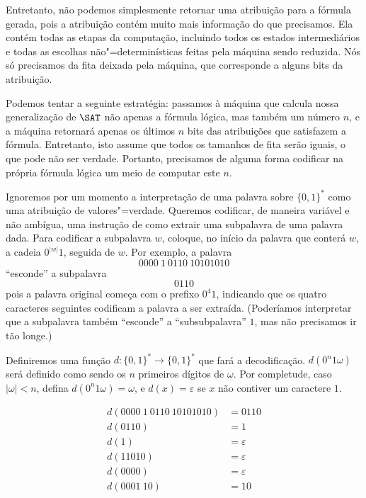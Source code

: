 Entretanto,
não podemos simplesmente retornar uma atribuição para a fórmula gerada,
pois a atribuição contém muito mais informação do que precisamos.
Ela contém todas as etapas da computação,
incluindo todos os estados intermediários
e todas as escolhas não"=determinísticas feitas pela máquina sendo reduzida.
Nós só precisamos da fita deixada pela máquina,
que corresponde a alguns bits da atribuição.

Podemos tentar a seguinte estratégia:
passamos à máquina que calcula nossa generalização de $\SAT$
não apenas a fórmula lógica,
mas também um número $n$,
e a máquina retornará apenas os últimos $n$
bits das atribuições que satisfazem a fórmula.
Entretanto, isto assume que todos os tamanhos de fita serão iguais,
o que pode não ser verdade.
Portanto, precisamos de alguma forma codificar na própria fórmula lógica
um meio de computar este $n$.

Ignoremos por um momento a interpretação de uma palavra sobre $\{0, 1\}^*$
como uma atribuição de valores"=verdade.
Queremos codificar, de maneira variável e não ambígua,
uma instrução de como extrair uma subpalavra de uma palavra dada.
Para codificar a subpalavra $w$,
coloque, no início da palavra que conterá $w$,
a cadeia $0^{|w|}1$, seguida de $w$.
Por exemplo,
a palavra
\begin{equation*}
    0000\ 1\ 0110\ 10101010
\end{equation*}
``esconde'' a subpalavra
\begin{equation*}
    0110
\end{equation*}
pois a palavra original começa com o prefixo $0^4 1$,
indicando que os quatro caracteres seguintes codificam a palavra a ser extraída.
(Poderíamos interpretar que a subpalavra também ``esconde''
a ``subsubpalavra'' $1$, mas não precisamos ir tão longe.)

Definiremos uma função $d: \{0, 1\}^* \to \{0, 1\}^*$ que fará a decodificação.
$d(0^n1\omega)$ será definido como sendo os $n$ primeiros dígitos de $\omega$.
Por completude, caso $|\omega| < n$, defina $d(0^n1\omega) = \omega$,
e $d(x) = \varepsilon$ se $x$ não contiver um caractere $1$.
\begin{example}
    \begin{align*}
        d(0000\ 1\ 0110\ 10101010) &= 0110 \\
        d(0110) &= 1 \\
        d(1) &= \varepsilon \\
        d(11010) &= \varepsilon \\
        d(0000) &= \varepsilon \\
        d(0001\ 10) &= 10
    \end{align*}
\end{example}

